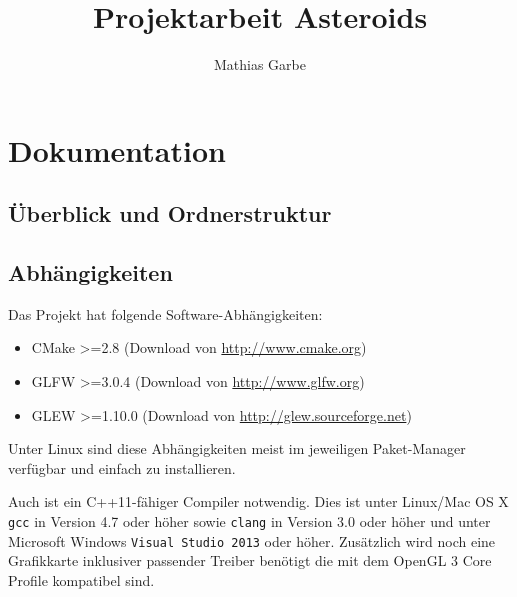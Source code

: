 \documentclass[12pt, a4paper, titlepage, hidelinks]{scrreprt}
\title{Projektarbeit Asteroids}
\subtitle{Dokumentation und Ausblick
\begin{figure}[h!]
  \centering
  \texttt{[image: screenshot.png]}
\end{figure}
}
\author{Mathias Garbe}
\begin{document}
\maketitle


\tableofcontents
{}

\clearpage


\chapter{Dokumentation}



\section{Überblick und Ordnerstruktur}


\section{Abhängigkeiten}

Das Projekt hat folgende Software-Abhängigkeiten:
\begin{itemize}
  \item CMake >=2.8 (Download von \url{http://www.cmake.org})
  \item GLFW >=3.0.4 (Download von \url{http://www.glfw.org})
  \item GLEW >=1.10.0 (Download von \url{http://glew.sourceforge.net})
\end{itemize}

Unter Linux sind diese Abhängigkeiten meist im jeweiligen Paket-Manager verfügbar und einfach zu installieren.

Auch ist ein C++11-fähiger Compiler notwendig. Dies ist unter Linux/Mac OS X \texttt{gcc} in Version 4.7 oder höher sowie \texttt{clang} in Version 3.0 oder höher und unter Microsoft Windows \texttt{Visual Studio 2013} oder höher. Zusätzlich wird noch eine Grafikkarte inklusiver passender Treiber benötigt die mit dem OpenGL 3 Core Profile kompatibel sind.
\end{document}
